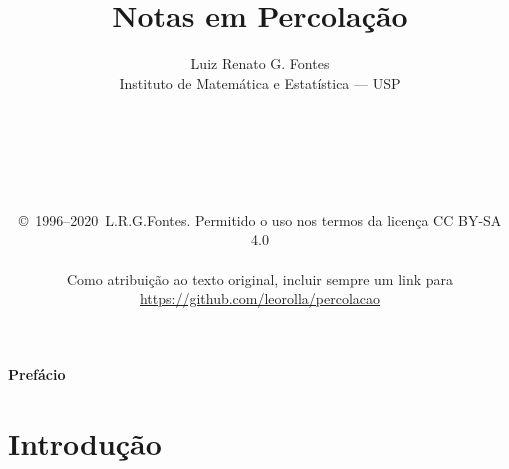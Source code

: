 \documentclass[12pt,a4paper]{book}
\begin{document}


\title{\LARGE{\bf Notas em Percolação}} 
\author{Luiz Renato G. Fontes\\Instituto de Matemática e Estatística --- USP\\
\\
\\
\\
\\
\\
\\
\small
\copyright\ 1996--2020\ L.R.G.Fontes. Permitido o uso nos termos da licença CC BY-SA 4.0\\
\\
\small
Como atribuição ao texto original, incluir sempre um link para\\
\small
\url{https://github.com/leorolla/percolacao}}
\date{}
\maketitle

\newpage
{}



\mbox{}
\vspace{2cm}

\begin{flushleft}
{\Huge {\bf Prefácio}}
\end{flushleft}
\vspace{70pt}



\newpage  

\tableofcontents

\newtheorem{teo}{Teorema}[section]
\newtheorem{Teo}{Teorema}[chapter]
\newtheorem{defin}{Definição}[section]
\newtheorem{prop}{Proposição}[section]
\newtheorem{lem}{Lema}[section]
\newtheorem{obs}{Observação}[section]
\newtheorem{cor}{Corolário}[section]
\newtheorem{Defin}{Definição}[chapter]
\newtheorem{Prop}{Proposição}[chapter]
\newtheorem{Lem}{Lema}[chapter]
\newtheorem{Obs}{Observação}[chapter]
\newtheorem{Cor}{Corolário}[chapter]
\renewcommand{\theequation}{\thesection .\arabic{equation}}




\chapter{Introdução}
\setcounter{equation}{0}
\label{chp:int}

\end{document}
